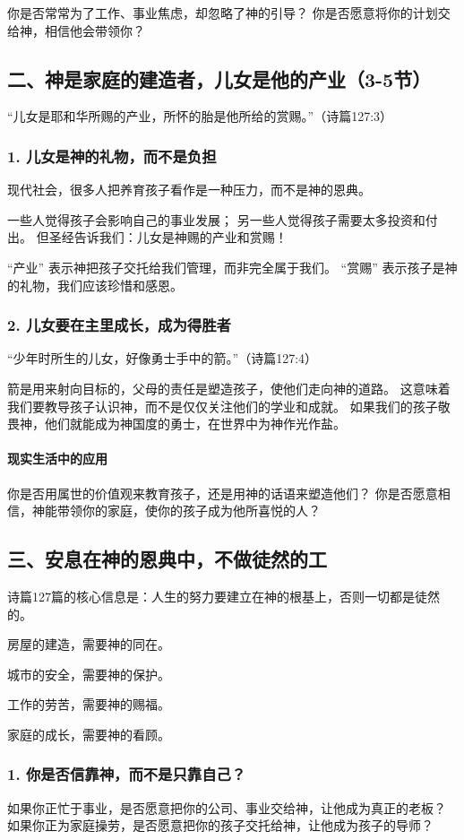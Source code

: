 \documentclass[a4paper, 12pt]{article}
\begin{document}
你是否常常为了工作、事业焦虑，却忽略了神的引导？
你是否愿意将你的计划交给神，相信他会带领你？
\subsection*{二、神是家庭的建造者，儿女是他的产业（3-5节）}
“儿女是耶和华所赐的产业，所怀的胎是他所给的赏赐。”（诗篇127:3）

\subsubsection*{1. 儿女是神的礼物，而不是负担}
现代社会，很多人把养育孩子看作是一种压力，而不是神的恩典。

一些人觉得孩子会影响自己的事业发展；
另一些人觉得孩子需要太多投资和付出。
但圣经告诉我们：儿女是神赐的产业和赏赐！

“产业” 表示神把孩子交托给我们管理，而非完全属于我们。
“赏赐” 表示孩子是神的礼物，我们应该珍惜和感恩。
\subsubsection*{2. 儿女要在主里成长，成为得胜者}
“少年时所生的儿女，好像勇士手中的箭。”（诗篇127:4）

箭是用来射向目标的，父母的责任是塑造孩子，使他们走向神的道路。
这意味着我们要教导孩子认识神，而不是仅仅关注他们的学业和成就。
如果我们的孩子敬畏神，他们就能成为神国度的勇士，在世界中为神作光作盐。
\paragraph*{现实生活中的应用}

你是否用属世的价值观来教育孩子，还是用神的话语来塑造他们？
你是否愿意相信，神能带领你的家庭，使你的孩子成为他所喜悦的人？
\subsection*{三、安息在神的恩典中，不做徒然的工}
诗篇127篇的核心信息是：人生的努力要建立在神的根基上，否则一切都是徒然的。

房屋的建造，需要神的同在。

城市的安全，需要神的保护。

工作的劳苦，需要神的赐福。

家庭的成长，需要神的看顾。

\subsubsection*{1. 你是否信靠神，而不是只靠自己？}
如果你正忙于事业，是否愿意把你的公司、事业交给神，让他成为真正的老板？
如果你正为家庭操劳，是否愿意把你的孩子交托给神，让他成为孩子的导师？
\end{document}
